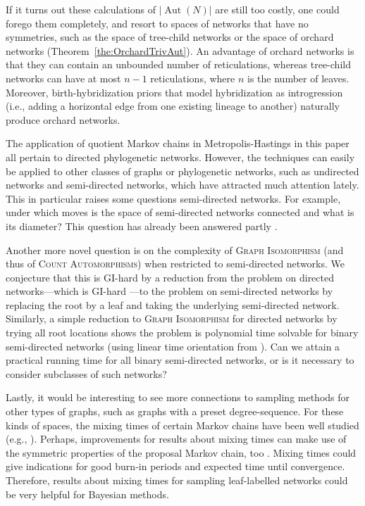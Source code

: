 \documentclass{article}
\theoremstyle{definition}
\DeclareMathOperator{\Aut}{Aut}
\begin{document}
If it turns out these calculations of $|\Aut(N)|$ are still too costly, one could forego them completely, and resort to spaces of networks that have no symmetries, such as the space of tree-child networks \cite{mcdiarmid2015counting,Klawitter2018SNPRneigh} or the space of orchard networks (Theorem~\ref{the:OrchardTrivAut}). An advantage of orchard networks is that they can contain an unbounded number of reticulations, whereas tree-child networks can have at most $n-1$ reticulations, where $n$ is the number of leaves. Moreover, birth-hybridization priors that model hybridization as introgression (i.e., adding a horizontal edge from one existing lineage to another) naturally produce orchard networks.

The application of quotient Markov chains in Metropolis-Hastings in this paper all pertain to directed phylogenetic networks. However, the techniques can easily be applied to other classes of graphs or phylogenetic networks, such as undirected networks and semi-directed networks, which have attracted much attention lately. This in particular raises some questions semi-directed networks. For example, under which moves is the space of semi-directed networks connected and what is its diameter? This question has already been answered partly \cite{linz2023exploring}.

Another more novel question is on the complexity of \textsc{Graph Isomorphism} (and thus of \textsc{Count Automorphisms}) when restricted to semi-directed networks. We conjecture that this is GI-hard by a reduction from the problem on directed networks---which is GI-hard \cite{cardona2014comparison}---to the problem on semi-directed networks by replacing the root by a leaf and taking the underlying semi-directed network. Similarly, a simple reduction to \textsc{Graph Isomorphism} for directed networks by trying all root locations shows the problem is polynomial time solvable for binary semi-directed networks (using linear time orientation from \cite{huber2024orienting}). Can we attain a practical running time for all binary semi-directed networks, or is it necessary to consider subclasses of such networks?

Lastly, it would be interesting to see more connections to sampling methods for other types of graphs, such as graphs with a preset degree-sequence. For these kinds of spaces, the mixing times of certain Markov chains have been well studied (e.g., \cite{kleer2019nash}). Perhaps, improvements for results about mixing times can make use of the symmetric properties of the proposal Markov chain, too \cite[e.g.][]{doi:10.1137/070689413, doi:10.1080/15427951.2005.10129100}. Mixing times could give indications for good burn-in periods and expected time until convergence. Therefore, results about mixing times for sampling leaf-labelled networks could be very helpful for Bayesian methods.
\end{document}
